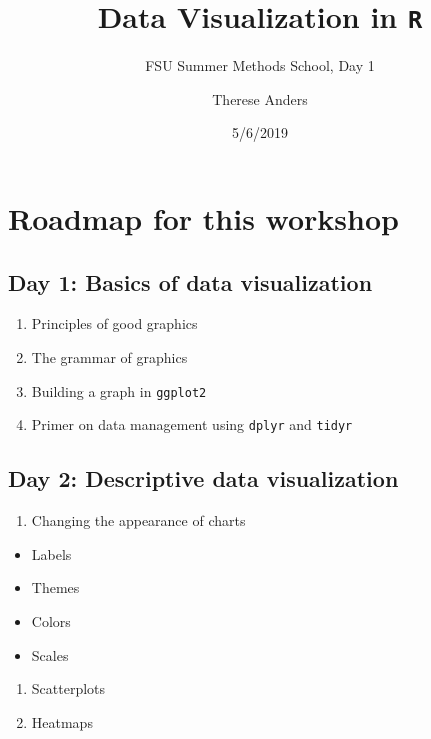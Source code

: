 \documentclass[]{article}
\title{Data Visualization in \texttt{R}}
\subtitle{FSU Summer Methods School, Day 1}
\author{Therese Anders}
\date{5/6/2019}
\providecommand{\tightlist}{%
  \setlength{\itemsep}{0pt}\setlength{\parskip}{0pt}}
\begin{document}
\maketitle

\hypertarget{roadmap-for-this-workshop}{%
\section{Roadmap for this workshop}\label{roadmap-for-this-workshop}}

\hypertarget{day-1-basics-of-data-visualization}{%
\subsection{Day 1: Basics of data
visualization}\label{day-1-basics-of-data-visualization}}

\begin{enumerate}
\def\labelenumi{\arabic{enumi}.}
\tightlist
\item
  Principles of good graphics
\item
  The grammar of graphics
\item
  Building a graph in \texttt{ggplot2}
\item
  Primer on data management using \texttt{dplyr} and \texttt{tidyr}
\end{enumerate}

\hypertarget{day-2-descriptive-data-visualization}{%
\subsection{Day 2: Descriptive data
visualization}\label{day-2-descriptive-data-visualization}}

\begin{enumerate}
\def\labelenumi{\arabic{enumi}.}
\tightlist
\item
  Changing the appearance of charts
\end{enumerate}

\begin{itemize}
\tightlist
\item
  Labels
\item
  Themes
\item
  Colors
\item
  Scales
\end{itemize}

\begin{enumerate}
\def\labelenumi{\arabic{enumi}.}
\setcounter{enumi}{1}
\tightlist
\item
  Scatterplots
\item
  Heatmaps
\end{enumerate}
\end{document}
